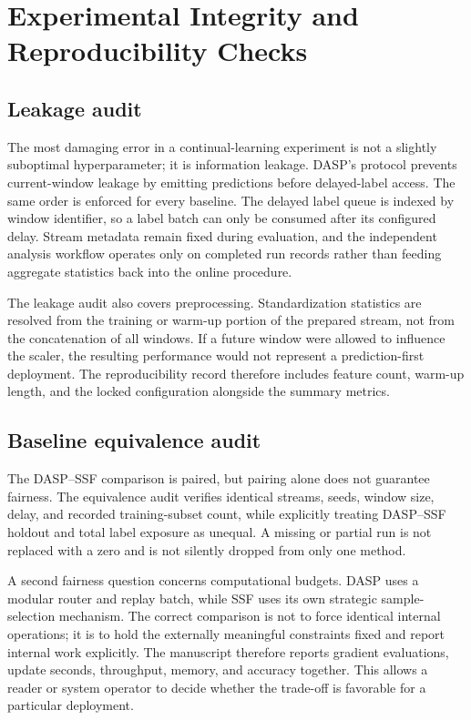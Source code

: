 \section{Experimental Integrity and Reproducibility Checks}
\label{sec:quality-assurance}

\subsection{Leakage audit}
The most damaging error in a continual-learning experiment is not a slightly suboptimal hyperparameter; it is information leakage. DASP's protocol prevents current-window leakage by emitting predictions before delayed-label access. The same order is enforced for every baseline. The delayed label queue is indexed by window identifier, so a label batch can only be consumed after its configured delay. Stream metadata remain fixed during evaluation, and the independent analysis workflow operates only on completed run records rather than feeding aggregate statistics back into the online procedure.

The leakage audit also covers preprocessing. Standardization statistics are resolved from the training or warm-up portion of the prepared stream, not from the concatenation of all windows. If a future window were allowed to influence the scaler, the resulting performance would not represent a prediction-first deployment. The reproducibility record therefore includes feature count, warm-up length, and the locked configuration alongside the summary metrics.

\subsection{Baseline equivalence audit}
The DASP--SSF comparison is paired, but pairing alone does not guarantee fairness. The equivalence audit verifies identical streams, seeds, window size, delay, and recorded training-subset count, while explicitly treating DASP--SSF holdout and total label exposure as unequal. A missing or partial run is not replaced with a zero and is not silently dropped from only one method.

A second fairness question concerns computational budgets. DASP uses a modular router and replay batch, while SSF uses its own strategic sample-selection mechanism. The correct comparison is not to force identical internal operations; it is to hold the externally meaningful constraints fixed and report internal work explicitly. The manuscript therefore reports gradient evaluations, update seconds, throughput, memory, and accuracy together. This allows a reader or system operator to decide whether the trade-off is favorable for a particular deployment.

